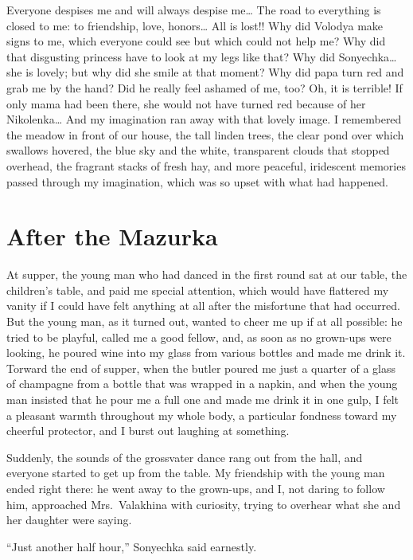 Everyone despises me and will always despise me\ldots{} The road to everything is closed to me: to friendship, love, honors\ldots{} All is lost!! Why did Volodya make signs to me, which everyone could see but which could not help me? Why did that disgusting princess have to look at my legs like that? Why did Sonyechka\ldots{}she is lovely; but why did she smile at that moment? Why did papa turn red and grab me by the hand? Did he really feel ashamed of me, too? Oh, it is terrible! If only mama had been there, she would not have turned red because of her Nikolenka\ldots{} And my imagination ran away with that lovely image. I remembered the meadow in front of our house, the tall linden trees, the clear pond over which swallows hovered, the blue sky and the white, transparent clouds that stopped overhead, the fragrant stacks of fresh hay, and more peaceful, iridescent memories passed through my imagination, which was so upset with what had happened.

\chapter{After the Mazurka} %

At supper, the young man who had danced in the first round sat at our table, the children's table, and paid me special attention, which would have flattered my vanity if I could have felt anything at all after the misfortune that had occurred. But the young man, as it turned out, wanted to cheer me up if at all possible: he tried to be playful, called me a good fellow, and, as soon as no grown-ups were looking, he poured wine into my glass from various bottles and made me drink it. Torward the end of supper, when the butler poured me just a quarter of a glass of champagne from a bottle that was wrapped in a napkin, and when the young man insisted that he pour me a full one and made me drink it in one gulp, I felt a pleasant warmth throughout my whole body, a particular fondness toward my cheerful protector, and I burst out laughing at something.

Suddenly, the sounds of the grossvater dance rang out from the hall, and everyone started to get up from the table. My friendship with the young man ended right there: he went away to the grown-ups, and I, not daring to follow him, approached Mrs.~Valakhina with curiosity, trying to overhear what she and her daughter were saying.

``Just another half hour,'' Sonyechka said earnestly. %

